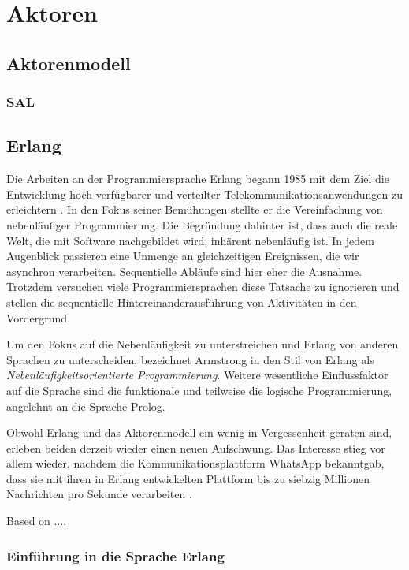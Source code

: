 \chapter{Aktoren}

\section{Aktorenmodell}

\subsection{SAL}

\section{Erlang}

Die Arbeiten an der Programmiersprache Erlang begann \citeauthor{Armstrong:1997:DE:258948.258967} 1985 mit dem Ziel die Entwicklung hoch verfügbarer und verteilter Telekommunikationsanwendungen zu erleichtern \cite{Armstrong:1997:DE:258948.258967}. In den Fokus seiner Bemühungen stellte er die Vereinfachung von nebenläufiger Programmierung. Die Begründung dahinter ist, dass auch die reale Welt, die mit Software nachgebildet wird, inhärent nebenläufig ist. In jedem Augenblick passieren eine Unmenge an gleichzeitigen Ereignissen, die wir asynchron verarbeiten. Sequentielle Abläufe sind hier eher die Ausnahme. Trotzdem versuchen viele Programmiersprachen diese Tatsache zu ignorieren und stellen die sequentielle Hintereinanderausführung von Aktivitäten in den Vordergrund.

Um den Fokus auf die Nebenläufigkeit zu unterstreichen und Erlang von anderen Sprachen zu unterscheiden, bezeichnet Armstrong in \cite[19]{armstrong03} den Stil von Erlang als \textit{Nebenläufigkeitsorientierte Programmierung}. Weitere wesentliche Einflussfaktor auf die Sprache sind die funktionale und teilweise die logische Programmierung, angelehnt an die Sprache Prolog.

Obwohl Erlang und das Aktorenmodell ein wenig in Vergessenheit geraten sind, erleben beiden derzeit wieder einen neuen Aufschwung. Das Interesse stieg vor allem wieder, nachdem die Kommunikationsplattform WhatsApp bekanntgab, dass sie mit ihren in Erlang entwickelten Plattform bis zu siebzig Millionen Nachrichten pro Sekunde verarbeiten \cite{ErlangWhatsApp}.

Based on ....

\subsection{Einführung in die Sprache Erlang}

